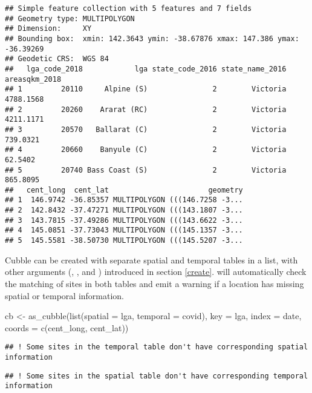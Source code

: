 \documentclass{article}
\newenvironment{Shaded}{\begin{snugshade}}{\end{snugshade}}
\newcommand{\AttributeTok}[1]{\textcolor[rgb]{0.77,0.63,0.00}{#1}}
\newcommand{\FunctionTok}[1]{\textcolor[rgb]{0.00,0.00,0.00}{#1}}
\newcommand{\NormalTok}[1]{#1}
\newcommand{\OtherTok}[1]{\textcolor[rgb]{0.56,0.35,0.01}{#1}}
\begin{document}
\begin{verbatim}
## Simple feature collection with 5 features and 7 fields
## Geometry type: MULTIPOLYGON
## Dimension:     XY
## Bounding box:  xmin: 142.3643 ymin: -38.67876 xmax: 147.386 ymax: -36.39269
## Geodetic CRS:  WGS 84
##   lga_code_2018            lga state_code_2016 state_name_2016 areasqkm_2018
## 1         20110     Alpine (S)               2        Victoria     4788.1568
## 2         20260    Ararat (RC)               2        Victoria     4211.1171
## 3         20570   Ballarat (C)               2        Victoria      739.0321
## 4         20660    Banyule (C)               2        Victoria       62.5402
## 5         20740 Bass Coast (S)               2        Victoria      865.8095
##   cent_long  cent_lat                       geometry
## 1  146.9742 -36.85357 MULTIPOLYGON (((146.7258 -3...
## 2  142.8432 -37.47271 MULTIPOLYGON (((143.1807 -3...
## 3  143.7815 -37.49286 MULTIPOLYGON (((143.6622 -3...
## 4  145.0851 -37.73043 MULTIPOLYGON (((145.1357 -3...
## 5  145.5581 -38.50730 MULTIPOLYGON (((145.5207 -3...
\end{verbatim}

Cubble can be created with separate spatial and temporal tables in a list, with other arguments (, , and ) introduced in section \ref{create}.  will automatically check the matching of sites in both tables and emit a warning if a location has missing spatial or temporal information.

\begin{Shaded}
\begin{Highlighting}[]
\NormalTok{cb }\OtherTok{\textless{}{-}} \FunctionTok{as\_cubble}\NormalTok{(}\FunctionTok{list}\NormalTok{(}\AttributeTok{spatial =}\NormalTok{ lga, }\AttributeTok{temporal =}\NormalTok{ covid),}
                \AttributeTok{key =}\NormalTok{ lga, }\AttributeTok{index =}\NormalTok{ date, }\AttributeTok{coords =} \FunctionTok{c}\NormalTok{(cent\_long, cent\_lat))}
\end{Highlighting}
\end{Shaded}

\begin{verbatim}
## ! Some sites in the temporal table don't have corresponding spatial information
\end{verbatim}

\begin{verbatim}
## ! Some sites in the spatial table don't have corresponding temporal information
\end{verbatim}
\end{document}
